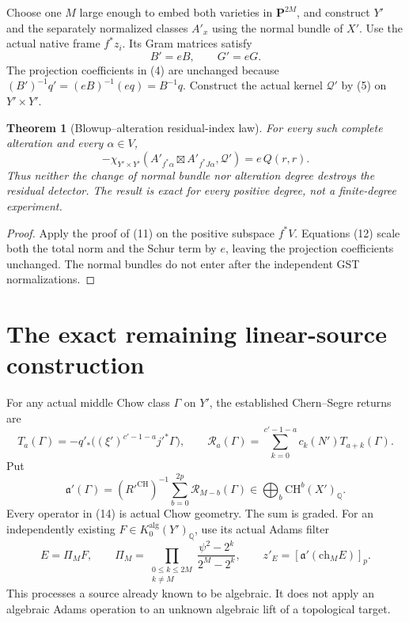 \documentclass[11pt]{article}
\newcommand{\Q}{\mathbb Q}
\newcommand{\CH}{\mathrm{CH}}
\newcommand{\ch}{\mathrm{ch}}
\newtheorem{theorem}{Theorem}
\begin{document}
Choose one $M$ large enough to embed both varieties in
$\mathbf P^{2M}$, and construct $Y'$ and the separately
normalized classes $A'_x$ using the normal bundle of $X'$.
Use the actual native frame $f^*z_i$. Its Gram matrices satisfy
\[
 B'=eB,\qquad G'=eG.
\]
The projection coefficients in (4) are unchanged because
$(B')^{-1}q'=(eB)^{-1}(eq)=B^{-1}q$.
Construct the actual kernel $\mathscr Q'$ by (5) on $Y'\times Y'$.

\begin{theorem}[Blowup--alteration residual-index law]
For every such complete alteration and every $\alpha\in V$,
\[
 \boxed{
 -\chi_{Y'\times Y'}
   (A'_{f^*\alpha}\boxtimes A'_{f^*J\alpha},\mathscr Q')
       =e\,Q(r,r).}                                 \tag{13}
\]
Thus neither the change of normal bundle nor alteration degree
destroys the residual detector. The result is exact for every
positive degree, not a finite-degree experiment.
\end{theorem}
\begin{proof}
Apply the proof of (11) on the positive subspace $f^*V$.
Equations (12) scale both the total norm and the Schur term
by $e$, leaving the projection coefficients unchanged.
The normal bundles do not enter after the independent
GST normalizations.
\end{proof}

\section{The exact remaining linear-source construction}
For any actual middle Chow class $\Gamma$ on $Y'$, the established
Chern--Segre returns are
\[
 T_a(\Gamma)=-q'_*\bigl((\xi')^{c'-1-a}j'^*\Gamma\bigr),\qquad
 \mathcal R_a(\Gamma)=
    \sum_{k=0}^{c'-1-a}c_k(N')T_{a+k}(\Gamma).
\]
Put
\[
 \mathfrak a'(\Gamma)
 =(R'^{\CH})^{-1}
    \sum_{b=0}^{2p}\mathcal R_{M-b}(\Gamma)
       \in\bigoplus_b\CH^b(X')_\Q.                  \tag{14}
\]
Every operator in (14) is actual Chow geometry. The sum is graded.
For an independently existing $F\in K_0^{\mathrm{alg}}(Y')_\Q$,
use its actual Adams filter
\[
 E=\Pi_MF,\qquad
 \Pi_M=\prod_{\substack{0\le k\le2M\\k\ne M}}
             \frac{\psi^2-2^k}{2^M-2^k},\qquad
 z'_E=[\mathfrak a'(\ch_M E)]_p.                    \tag{15}
\]
This processes a source already known to be algebraic.
It does not apply an algebraic Adams operation to an unknown
algebraic lift of a topological target.
\end{document}
